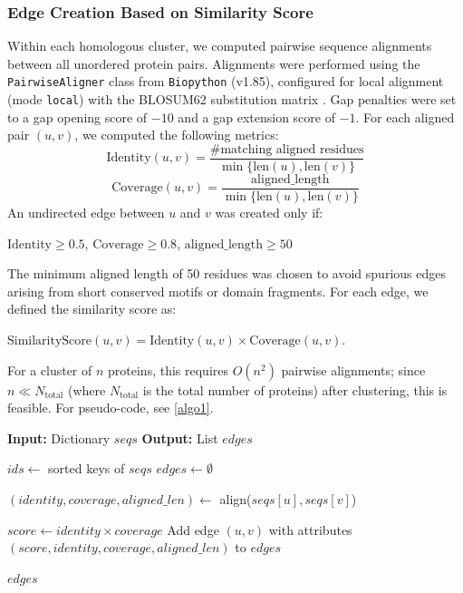 \documentclass[11pt]{article}
\begin{document}
	\subsubsection[step 2]{Edge Creation Based on Similarity Score}
	\label{subsubsec:step2}
	Within each homologous cluster, we computed pairwise sequence alignments between all unordered protein pairs. Alignments were performed using the \texttt{PairwiseAligner} class from \texttt{Biopython} (v1.85), configured for local alignment (mode \texttt{local}) with the BLOSUM62 substitution matrix \cite{BLOSUM}. Gap penalties were set to a gap opening score of $-10$ and a gap extension score of $-1$.
	For each aligned pair $(u,v)$, we computed the following metrics:\\
	\begin{equation*}
	\text{Identity}(u,v) =
	\frac{\#\text{matching aligned residues}}
	{\min\{\text{len}(u), \text{len}(v)\}}
	\end{equation*}
	\begin{equation*}
	\text{Coverage}(u,v) =
	\frac{\text{aligned\_length}}
	{\min\{\text{len}(u), \text{len}(v)\}}
	\end{equation*}
	An undirected edge between $u$ and $v$ was created only if:
	\begin{center}
		$\text{Identity} \ge 0.5$, \quad
		$\text{Coverage} \ge 0.8$, \quad
		$\text{aligned\_length} \ge 50$
	\end{center}
	The minimum aligned length of 50 residues was chosen to avoid spurious edges arising from short conserved motifs or domain fragments. For each edge, we defined the similarity score as:
	\begin{center}
		$\text{SimilarityScore}(u,v) = \text{Identity}(u,v) \times \text{Coverage}(u,v).$
	\end{center}
	For a cluster of $n$ proteins, this requires $O(n^2)$ pairwise alignments; since $n \ll N_{\text{total}}$ (where $N_{\text{total}}$ is the total number of proteins) after clustering, this is feasible. For pseudo-code, see \cref{algo1}.
	\begin{algorithm}
		\caption{BuildEdgesFromAlignments}
		\begin{algorithmic}[1]
			\State \textbf{Input:} Dictionary $seqs$
			\State \textbf{Output:} List $edges$
			
			\State $ids \gets$ sorted keys of $seqs$
			\State $edges \gets \emptyset$
			
			\State $(identity, coverage, aligned\_len) \gets$ align($seqs[u], seqs[v]$)
			
			\State $score \gets identity \times coverage$
			\State Add edge $(u,v)$ with attributes $(score, identity, coverage, aligned\_len)$ to $edges$
			\EndIf
			\EndFor
			
			\State \Return $edges$
		\end{algorithmic}
		\label{algo1}
	\end{algorithm}
	
\end{document}

